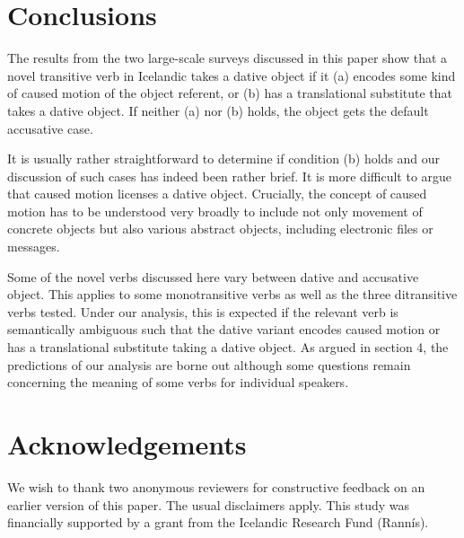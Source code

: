 \documentclass[output=paper,modfonts,nonflat]{langsci/langscibook}
\begin{document}
\section{Conclusions}

The results from the two large-scale surveys discussed in this paper show that a novel transitive verb in Icelandic takes a dative object if it (a) encodes some kind of caused motion of the object referent, or (b) has a translational substitute that takes a dative object. If neither (a) nor (b) holds, the object gets the default accusative case. 

It is usually rather straightforward to determine if condition (b) holds and our discussion of such cases has indeed been rather brief. It is more difficult to argue that caused motion licenses a dative object. Crucially, the concept of caused motion has to be understood very broadly to include not only movement of concrete objects but also various abstract objects, including electronic files or messages. 

Some of the novel verbs discussed here vary between dative and accusative object. This applies to some monotransitive verbs as well as the three ditransitive verbs tested. Under our analysis, this is expected if the relevant verb is semantically ambiguous such that the dative variant encodes caused motion or has a translational substitute taking a dative object. As argued in section 4, the predictions of our analysis are borne out although some questions remain concerning the meaning of some verbs for individual speakers. 
\section*{Acknowledgements}

We wish to thank two anonymous reviewers for constructive feedback on an earlier version of this paper. The usual disclaimers apply. This study was financially supported by a grant from the Icelandic Research Fund (Rannís). 
\sloppy\printbibliography[heading=subbibliography,notkeyword=this]
\end{document}
